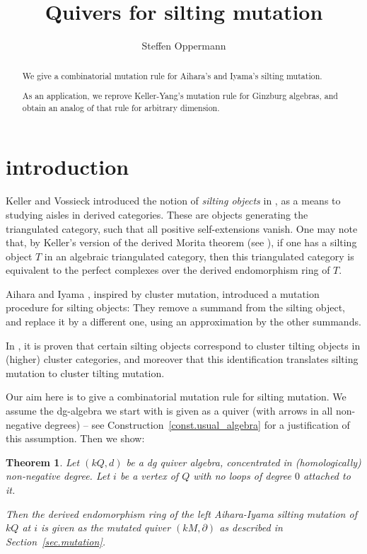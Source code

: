 \documentclass[a4paper,11pt]{amsart}
\title{Quivers for silting mutation}
\author[Oppermann]{Steffen Oppermann}
\newtheorem{theorem}{Theorem}
\theoremstyle{definition}
\numberwithin{theorem}{section}
\begin{document}
\maketitle

\begin{abstract}
We give a combinatorial mutation rule for Aihara's and Iyama's silting mutation.

As an application, we reprove Keller-Yang's mutation rule for Ginzburg algebras, and obtain an analog of that rule for arbitrary dimension.
\end{abstract}

\section{introduction}

Keller and Vossieck introduced the notion of \emph{silting objects} in \cite{keller-vossieck}, as a means to studying aisles in derived categories. These are objects generating the triangulated category, such that all positive self-extensions vanish. One may note that, by Keller's version of the derived Morita theorem (see \cite{keller-derived-morita}), if one has a silting object $T$ in an algebraic triangulated category, then this triangulated category is equivalent to the perfect complexes over the derived endomorphism ring of $T$.

Aihara and Iyama \cite{aihara-iyama}, inspired by cluster mutation, introduced a mutation procedure for silting objects: They remove a summand from the silting object, and replace it by a different one, using an approximation by the other summands.

In \cite{buan-reiten-thomas}, it is proven that certain silting objects correspond to cluster tilting objects in (higher) cluster categories, and moreover that this identification translates silting mutation to cluster tilting mutation. 

\medskip
Our aim here is to give a combinatorial mutation rule for silting mutation. We assume the dg-algebra we start with is given as a quiver (with arrows in all non-negative degrees) -- see Construction~\ref{const.usual_algebra} for a justification of this assumption. Then we show:

\begin{theorem} \label{thm.main_result}
Let $(kQ, d)$ be a dg quiver algebra, concentrated in (homologically) non-negative degree. Let $i$ be a vertex of $Q$ with no loops of degree $0$ attached to it.

Then the derived endomorphism ring of the left Aihara-Iyama silting mutation of $kQ$ at $i$ is given as the mutated quiver $(kM, \partial)$ as described in Section~\ref{sec.mutation}.
\end{theorem}
\end{document}
